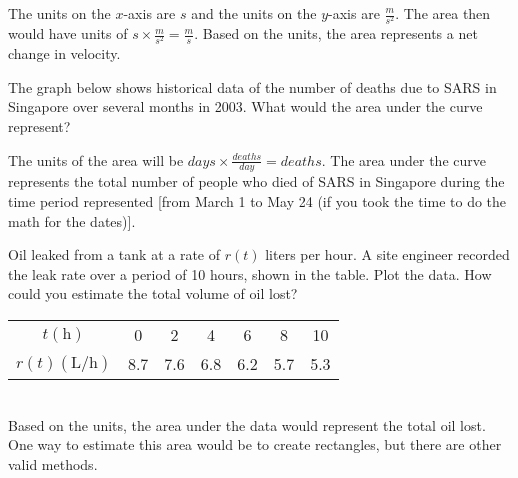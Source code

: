 \begin{Answer}[ref=units1]
The units on the $x$-axis are $s$ and the units on the $y$-axis are $\frac{m}{s^2}$. The area then would have units of $s \times \frac{m}{s^2}=\frac{m}{s}$. Based on the units, the area represents a net change in velocity. 
\end{Answer}

\begin{Exercise}[label=units2]
	The graph below shows historical data of the number of deaths due to SARS in Singapore over several months in 2003. What would the area under the curve represent?\\
	
\end{Exercise}

\begin{Answer}[ref=units2]
	The units of the area will be $days \times \frac{deaths}{day}=deaths$. The area under the curve represents the total number of people who died of SARS in Singapore during the time period represented [from March 1 to May 24 (if you took the time to do the math for the dates)]. 
\end{Answer}

\begin{Exercise}[label=units3]
	Oil leaked from a tank at a rate of $r(t)$ liters per hour. A site engineer recorded the leak rate over a period of 10 hours, shown in the table. Plot the data. How could you estimate the total volume of oil lost?\\
	\begin{tabular}{c|c|c|c|c|c|c}
	$t(\text{h})$ & 0 & 2 & 4 & 6 & 8 & 10 \\
	$r(t)(\text{L/h})$ & 8.7 & 7.6 & 6.8 & 6.2 & 5.7 & 5.3 \\
	\end{tabular}
\end{Exercise}

\begin{Answer}[ref=units3]
	\\
	Based on the units, the area under the data would represent the total oil lost. One way to estimate this area would be to create rectangles, but there are other valid methods. 
\end{Answer}

